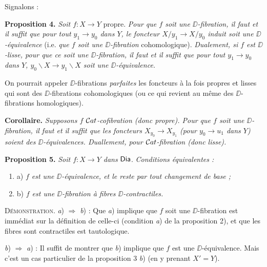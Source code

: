 
Signalons :

\textbf{Proposition 4.} \textit{Soit $f : X \to Y$} propre. \textit{Pour que $f$ soit une $\DD$-fibration, il faut et il suffit que pour tout $y_1 \to y_0$ dans $Y$, le foncteur $X/y_1 \to X/y_0$ induit soit une $\DD$-équivalence} (i.e. \textit{que $f$ soit une $\DD$-fibration} cohomologique). \textit{Dualement, si $f$ est $\DD$-lisse, pour que ce soit une $\DD$-fibration, il faut et il suffit que pour tout $y_1 \to y_0$ dans $Y$, $y_0\backslash X \to y_1\backslash X$ soit une $\DD$-équivalence.}

\indent On pourrait appeler $\DD$-fibrations \textit{parfaites} les foncteurs à la fois propres et lisses qui sont des $\DD$-fibrations cohomologiques (ou ce qui revient au même des $\DD$-fibrations homologiques).

\textbf{Corollaire.} \textit{Supposons $f$ $\mathcal{C}at$-cofibration (donc propre). Pour que $f$ soit une $\DD$-fibration, il faut et il suffit que les foncteurs $X_{y_0} \to X_{y_1}$ (pour $y_0 \to u_1$ dans $Y$) soient des $\DD$-équivalences. Duallement, pour $\mathcal{C}at$-fibration (donc lisse).} %

\textbf{Proposition 5.} \textit{Soit $f : X \to Y$ dans} $\mathsf{Dia}$. \textit{Conditions équivalentes :}
\begin{enumerate}[label={}, leftmargin=2em, labelsep=0pt]
\item a) \textit{$f$ est une $\DD$-équivalence, et le reste par tout changement de base ;}
\item b) \textit{$f$ est une $\DD$-fibration à fibres $\DD$-contractiles.}
\end{enumerate}

\textsc{Démonstration.} \textit{a}) $\Rightarrow$ \textit{b}) : Que \textit{a}) implique que $f$ soit une $\DD$-fibration est immédiat sur la définition de celle-ci (condition \textit{a}) de la proposition 2), et que les fibres sont contractiles est tautologique.

\textit{b}) $\Rightarrow$ \textit{a}) : Il suffit de montrer que \textit{b}) implique que $f$ est une $\DD$-équivalence. Mais c'est un cas particulier de la proposition 3 \textit{b}) (en y prenant $X' = Y$).

